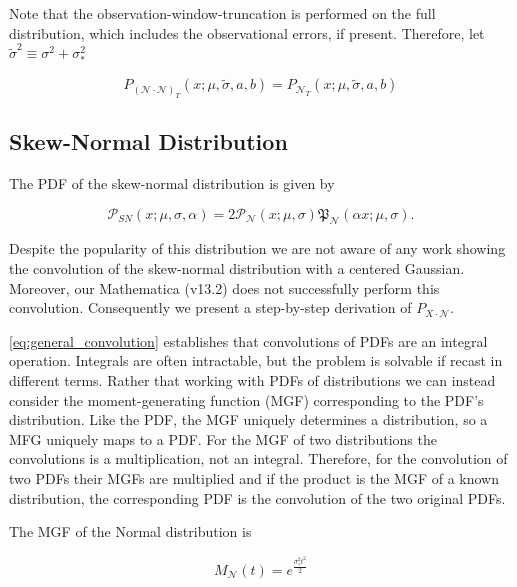 \documentclass[twocolumn]{aastex631}
\newcommand{\mfk}[1]{\mathfrak{#1}}
\newcommand{\mcal}[1]{\mathcal{#1}}
\newcommand{\Exp}[1]{e^{#1}}
\newcommand{\pdf}{\mcal{P}}
\newcommand{\cdf}{\mfk{P}}
\begin{document}
        Note that the observation-window-truncation is performed on the full distribution, which includes the observational errors, if present.
        Therefore, let $\tilde{\sigma}^2 \equiv \sigma^2+\sigma_*^2$

        \begin{equation}
            P_{(\mcal{N}\cdot\mcal{N})_T}(x; \mu, \tilde{\sigma}, a, b) = P_{\mcal{N}_T}(x; \mu, \tilde{\sigma}, a, b)
        \end{equation}

    \vspace{10pt}
    \subsection{Skew-Normal Distribution}

        The PDF of the skew-normal distribution is given by

        \begin{equation}
            \pdf_{SN}(x;\mu,\sigma,\alpha) = 2\pdf_{\mcal{N}}(x;\mu,\sigma)\cdf_{\mcal{N}}(\alpha x;\mu,\sigma).
        \end{equation}

        Despite the popularity of this distribution we are not aware of any work showing the convolution of the skew-normal distribution with a centered Gaussian. Moreover, our Mathematica (v13.2) does not successfully perform this convolution. Consequently we present a step-by-step derivation of $P_{X\cdot\mcal{N}}$.

        \autoref{eq:general_convolution} establishes that convolutions of PDFs are an integral operation. Integrals are often intractable, but the problem is solvable if recast in different terms. Rather that working with PDFs of distributions we can instead consider the moment-generating function (MGF) corresponding to the PDF's distribution. Like the PDF, the MGF uniquely determines a distribution, so a MFG uniquely maps to a PDF. For the MGF of two distributions the convolutions is a multiplication, not an integral.
        Therefore, for the convolution of two PDFs their MGFs are multiplied and if the product is the MGF of a known distribution, the corresponding PDF is the convolution of the two original PDFs.

        The MGF of the Normal distribution is

        \begin{equation} \label{eq:mgf_normal}
            M_{\mcal{N}}(t) = \Exp{\frac{\sigma_*^2 t^2}{2}}
        \end{equation}
\end{document}
